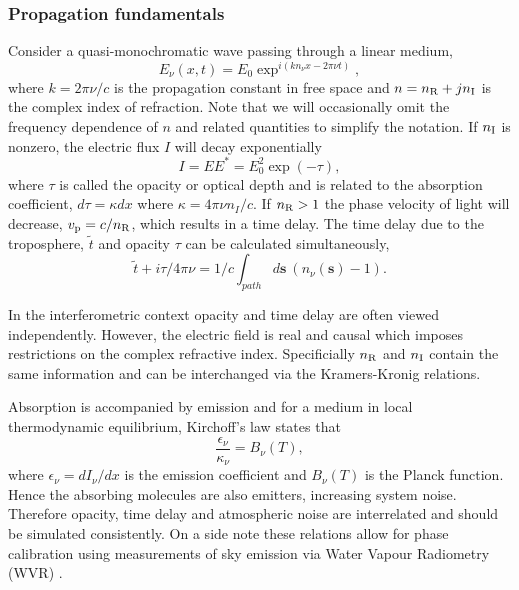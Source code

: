 \subsubsection{Propagation fundamentals}\label{sec:prop_fund}
Consider a quasi-monochromatic wave passing through a linear medium,
\begin{equation}
E_\nu(x,t) = E_0 \exp^{i(kn_\nu x - 2\pi\nu t)},
\end{equation}		
where $k=2\pi \nu/c$ is the propagation constant in free space and $n= n_{\rm R} + j n_{\rm I}$ is the complex index of refraction. Note that we will occasionally omit the frequency dependence of $n$ and related quantities to simplify the notation. If $n_{\rm I}$ is nonzero, the electric flux $I$ will decay exponentially
\begin{equation}
I = EE^\ast = E_0^2 \exp(-\tau),
\end{equation}
where $\tau$ is called the opacity or optical depth and is related to the absorption coefficient, $d\tau = \kappa dx$ where $\kappa = 4\pi \nu n_I/c$. If $n_{\rm R} > 1 $ the phase velocity of light will decrease, $v_{\rm p} = c/n_{\rm R}$, which results in a time delay. The time delay due to the troposphere, $\tilde{t}$ and opacity $\tau$ can be calculated simultaneously,
\begin{equation}\label{timedelay}
\tilde{t} + i \tau /4\pi \nu =1/c \int_{path} d\mathbf{s}\  (n_\nu(\mathbf{s}) -1).
\end{equation}

In the interferometric context opacity and time delay are often viewed independently. However, the electric field is real and causal which imposes restrictions on the complex refractive index. Specificially $n_{\rm R}$ and $n_{\rm I}$ contain the same information and can be interchanged via the Kramers-Kronig relations. 

Absorption is accompanied by emission and for a medium in local thermodynamic equilibrium, Kirchoff's law states that 
\begin{equation}\label{kirchoff}
\frac{\epsilon_\nu}{\kappa_\nu}=B_\nu(T),
\end{equation}
where $\epsilon_\nu = dI_\nu/dx$ is the emission coefficient and $B_\nu(T)$ is the Planck function. Hence the absorbing molecules are also emitters, increasing system noise. Therefore opacity, time delay and atmospheric noise are interrelated and should be simulated consistently. On a side note these relations allow for phase calibration using measurements of sky emission via Water Vapour Radiometry (WVR) \citep*[e.g.][]{Carilli_1999}.

